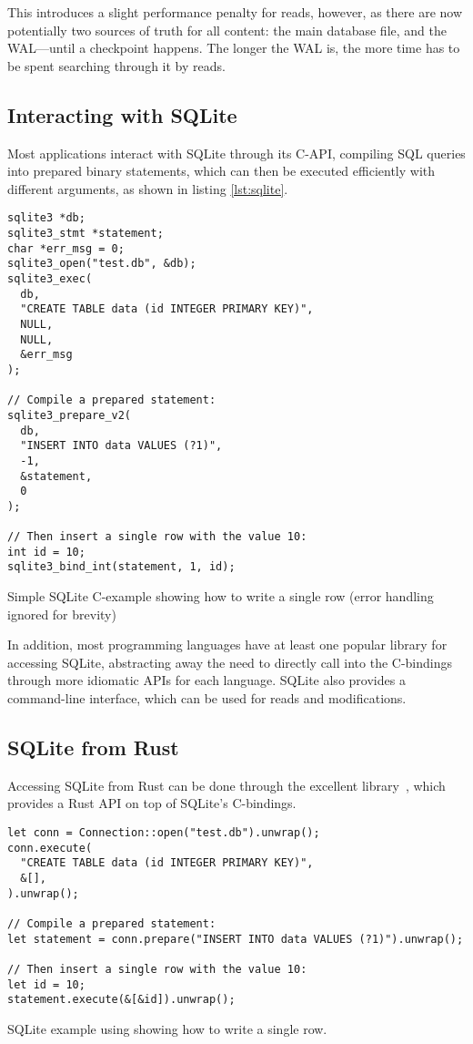 This introduces a slight performance penalty for reads, however, as there are
now potentially two sources of truth for all content: the main database file,
and the WAL---until a checkpoint happens. The longer the WAL is, the more time
has to be spent searching through it by reads.

\subsection{Interacting with SQLite}
Most applications interact with SQLite through its C-API, compiling SQL
queries into prepared binary statements, which can then be executed efficiently
with different arguments, as shown in listing \ref{lst:sqlite}.

\begin{listing}[H]
  \begin{verbatim}
sqlite3 *db;
sqlite3_stmt *statement;
char *err_msg = 0;
sqlite3_open("test.db", &db);
sqlite3_exec(
  db,
  "CREATE TABLE data (id INTEGER PRIMARY KEY)",
  NULL,
  NULL,
  &err_msg
);

// Compile a prepared statement:
sqlite3_prepare_v2(
  db,
  "INSERT INTO data VALUES (?1)",
  -1,
  &statement,
  0
);

// Then insert a single row with the value 10:
int id = 10;
sqlite3_bind_int(statement, 1, id);
  \end{verbatim}

  \caption{Simple SQLite C-example showing how to write a single row (error
  handling ignored for brevity)}\label{lst:sqlite}
\end{listing}

In addition, most programming languages have at least one popular library for
accessing SQLite, abstracting away the need to directly call into the C-bindings
through more idiomatic APIs for each language. SQLite also provides a
command-line interface, which can be used for reads and modifications.

\subsection{SQLite from Rust}

Accessing SQLite from Rust can be done through the excellent 
library~\cite{rusqlite}, which provides a Rust API on top of SQLite's
C-bindings.

\begin{listing}[H]
  \begin{verbatim}
let conn = Connection::open("test.db").unwrap();
conn.execute(
  "CREATE TABLE data (id INTEGER PRIMARY KEY)",
  &[],
).unwrap();

// Compile a prepared statement:
let statement = conn.prepare("INSERT INTO data VALUES (?1)").unwrap();

// Then insert a single row with the value 10:
let id = 10;
statement.execute(&[&id]).unwrap();

  \end{verbatim}

  \caption{SQLite example using  showing how to write a single
  row.}\label{lst:sqlite-rust}
\end{listing}

